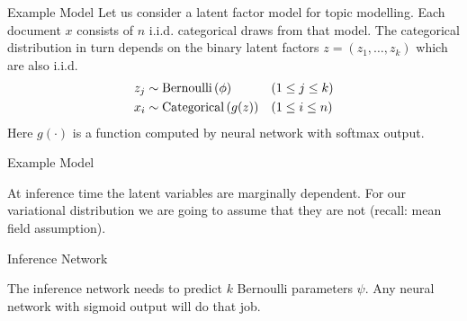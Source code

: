 \documentclass[14pt]{beamer}
\begin{document}
\begin{frame}{Example Model}
Let us consider a latent factor model for topic modelling. Each document $ x $ consists of $ n $ i.i.d.
categorical draws from that model. The categorical distribution in turn depends on the binary latent 
factors $ z = (z_{1},\ldots,z_{k}) $ which are also i.i.d.
\begin{equation*}
\begin{aligned}
z_{j} &\sim \operatorname{Bernoulli}\left(\phi\right) && (1 \leq j \leq k) \\ 
x_{i} &\sim \operatorname{Categorical}\left(g(z)\right) && (1 \leq i \leq n)
\end{aligned}
\end{equation*} 
Here $ g(\cdot) $ is a function computed by neural network with softmax output.
\end{frame}

\begin{frame}{Example Model}
\begin{figure}
\center
{}
\end{figure}
At inference time the latent variables are marginally dependent. For our variational distribution
we are going to assume that they are not (recall: mean field assumption).
\end{frame}

\begin{frame}{Inference Network}
\begin{figure}
\center
{}
\end{figure}
The inference network needs to predict $ k $ Bernoulli parameters $ \psi $. Any neural network with
sigmoid output will do that job.
\end{frame}
\end{document}
